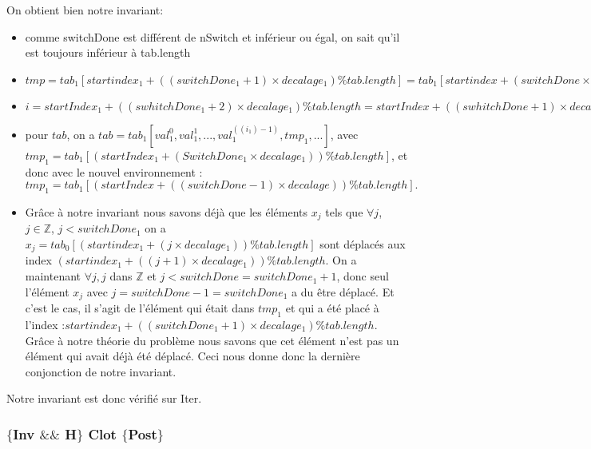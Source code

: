 On obtient bien notre invariant:
\begin{itemize}
	\item comme switchDone est différent de nSwitch et inférieur ou égal, on sait qu'il est toujours inférieur à tab.length
	\item $tmp = tab_{1}[startindex_{1} + ((switchDone_{1}+1)\times decalage_{1}) \% tab.length] = tab_{1}[startindex + (switchDone\times decalage) \% tab.length]$
	\item $i = startIndex_{1} + ((swhitchDone_{1}+2)\times decalage_{1}) \% tab.length = startIndex + ((swhitchDone+1)\times decalage) \%tab.length$
	\item pour $tab$, on a $tab = tab_{1}[val_{1}^{0},val_{1}^{1}, ..., val_{1}^{((i_{1})-1)}, tmp_{1}, ...]$, avec $tmp_{1} = tab_{1}[(startIndex_{1} + (SwitchDone_{1}\times decalage_{1})) \% tab.length]$, et donc avec le nouvel environnement : $tmp_{1} = tab_{1}[(startIndex + ((switchDone-1)\times decalage)) \% tab.length].$ 
	\item Grâce à notre invariant nous savons déjà que les éléments $x_{j}$ tels que $\forall j$, $j \in \mathbb{Z}$, $j<switchDone_{1}$ on a $x_{j}=tab_{0}[(startindex_{1} + (j\times decalage_{1})) \% tab.length]$ sont déplacés aux index $(startindex_{1} + ((j+1)\times decalage_{1}))\% tab.length$. On a maintenant $\forall j, j$ dans $\mathbb{Z}$ et $j<switchDone=switchDone_{1} + 1$, donc seul l'élément $x_{j}$ avec $j= switchDone - 1 = switchDone_{1}$ a du être déplacé. Et c'est le cas, il s'agit de l'élément qui était dans $tmp_{1}$ et qui a été placé à l'index :$ startindex_{1} + ((switchDone_{1}+1)\times decalage_{1}) \% tab.length$. Grâce à notre théorie du problème nous savons que cet élément n'est pas un élément qui avait déjà été déplacé. Ceci nous donne donc la dernière conjonction de notre invariant. \\
\end{itemize}

Notre invariant est donc vérifié sur Iter. \\

\subsubsection*{$\{$Inv $\&\&$ H$\}$ Clot $\{$Post$\}$}

